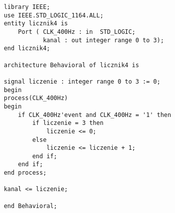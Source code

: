 \begin{lstlisting}
    library IEEE;
    use IEEE.STD_LOGIC_1164.ALL;
    entity licznik4 is
        Port ( CLK_400Hz : in  STD_LOGIC;
               kanal : out integer range 0 to 3);
    end licznik4;
    
    architecture Behavioral of licznik4 is
    
    signal liczenie : integer range 0 to 3 := 0;
    begin
    process(CLK_400Hz)
    begin
        if CLK_400Hz'event and CLK_400Hz = '1' then
            if liczenie = 3 then
                liczenie <= 0;
            else
                liczenie <= liczenie + 1;
            end if;
        end if;
    end process;
    
    kanal <= liczenie;
    
    end Behavioral;
\end{lstlisting}